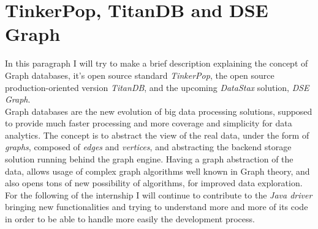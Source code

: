 \documentclass[a4paper]{report}
\newcommand{\ds}{\emph{DataStax\xspace}}
\newcommand{\jd}{\emph{Java driver\xspace}}
\newcommand{\dseg}{\emph{DSE Graph\xspace}}
\newcommand{\tdb}{\emph{TitanDB\xspace}}
\begin{document}
\section{TinkerPop, TitanDB and DSE Graph}
In this paragraph I will try to make a brief description explaining the concept of Graph databases, it's open source standard \emph{TinkerPop}, the open source production-oriented version \tdb{}, and the upcoming \ds{} solution, \dseg{}.\\
Graph databases are the new evolution of big data processing solutions, supposed to provide much faster processing and more coverage and simplicity for data analytics. The concept is to abstract the view of the real data, under the form of \emph{graphs}, composed of \emph{edges} and \emph{vertices}, and abstracting the backend storage solution running behind the graph engine. Having a graph abstraction of the data, allows usage of complex graph algorithms well known in Graph theory, and also opens tons of new possibility of algorithms, for improved data exploration.\\




For the following of the internship I will continue to contribute to the \jd{} bringing new functionalities and trying to understand more and more of its code in order to be able to handle more easily the development process.







\end{document}
